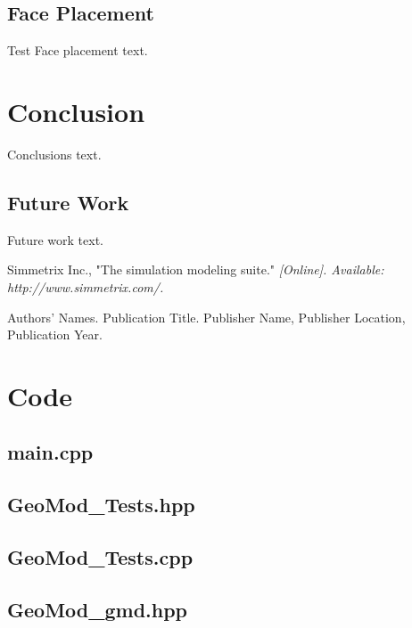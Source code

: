 \documentclass[a4paper, 12pt]{article}
\begin{document}
\subsection{Face Placement} \label{subsec:faceTest}
Test Face placement text.

\section{Conclusion} \label{sec:conclusion}
Conclusions text. 

\subsection{Future Work} \label{subsec:future}
Future work text.

\newpage
\begin{thebibliography}{99}

Simmetrix Inc., 
"The simulation modeling suite."
\textit{[Online]. Available: http://www.simmetrix.com/.}


Authors' Names. 
Publication Title.
Publisher Name, Publisher Location, Publication Year.

\end{thebibliography}

\newpage
\appendix
\section{Code} \label{sec:code}

\subsection{main.cpp} \label{subsec:main_cpp}


\subsection{GeoMod\_Tests.hpp} \label{subsec:Tests_hpp}

\subsection{GeoMod\_Tests.cpp} \label{subsec:Tests_cpp}


\subsection{GeoMod\_gmd.hpp} \label{subsec:gmd_hpp}

\end{document}

